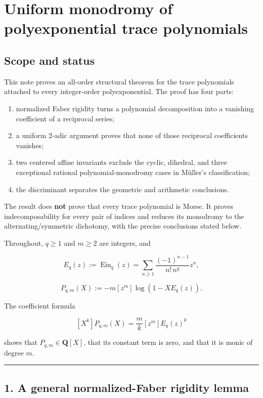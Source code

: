 \section{Uniform monodromy of polyexponential trace polynomials}

\subsection{Scope and status}

This note proves an all-order structural theorem for the trace polynomials
attached to every integer-order polyexponential. The proof has four parts:

\begin{enumerate}
\def\labelenumi{\arabic{enumi}.}
\tightlist
\item
  normalized Faber rigidity turns a polynomial decomposition into a
  vanishing coefficient of a reciprocal series;
\item
  a uniform 2-adic argument proves that none of those reciprocal
  coefficients vanishes;
\item
  two centered affine invariants exclude the cyclic, dihedral, and three
  exceptional rational polynomial-monodromy cases in Müller's
  classification;
\item
  the discriminant separates the geometric and arithmetic conclusions.
\end{enumerate}

The result does \textbf{not} prove that every trace polynomial is Morse. It proves
indecomposability for every pair of indices and reduces its monodromy to the
alternating/symmetric dichotomy, with the precise conclusions stated below.

Throughout, \(q\geq1\) and \(m\geq2\) are integers, and

\[
 E_q(z):=\operatorname {Ein}_q(z)
 =\sum_{n\geq1}\frac{(-1)^{n-1}}{n!\,n^q}z^n,
\]

\[
 P_{q,m}(X):=-m[z^m]\log(1-XE_q(z)).
\]

The coefficient formula

\[
 [X^k]P_{q,m}(X)=\frac{m}{k}[z^m]E_q(z)^k
\]

shows that \(P_{q,m}\in\mathbf Q[X]\), that its constant term is zero, and
that it is monic of degree \(m\).

\begin{center}\rule{0.5\linewidth}{0.5pt}\end{center}

\subsection{1. A general normalized-Faber rigidity lemma}

